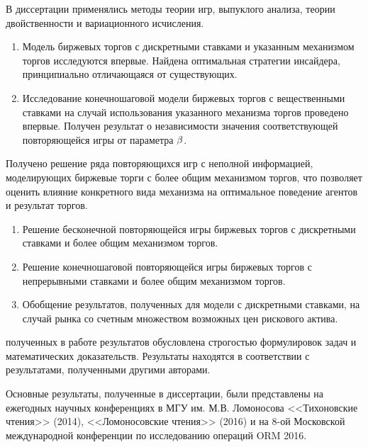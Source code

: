 {\methods} В диссертации применялись методы теории игр, выпуклого анализа, теории двойственности и вариационного исчисления.

{\novelty}
\begin{enumerate}
\item 
Модель биржевых торгов с дискретными ставками и указанным механизмом торгов исследуются впервые.
Найдена оптимальная стратегии инсайдера, принципиально отличающаяся от существующих.
\item 
Исследование конечношаговой модели биржевых торгов с вещественными ставками на случай использования указанного механизма торгов проведено впервые.
Получен результат о независимости значения соответствующей повторяющейся игры от параметра $\beta$.
\end{enumerate}

{\influence} Получено решение ряда повторяющихся игр с неполной информацией, моделирующих биржевые торги с более общим механизмом торгов, что позволяет оценить влияние конкретного вида механизма на оптимальное поведение агентов и результат торгов.

{}
\begin{enumerate}
\item
Решение бесконечной повторяющейся игры биржевых торгов с дискретными ставками и более общим механизмом торгов.
\item
Решение конечношаговой повторяющейся игры биржевых торгов с непрерывными ставками и более общим механизмом торгов.
\item
Обобщение результатов, полученных для модели с дискретными ставками, на случай рынка со счетным множеством возможных цен рискового актива.
\end{enumerate}

{\reliability} полученных в работе результатов обусловлена строгостью формулировок задач и математических доказательств.
Результаты находятся в соответствии с результатами, полученными другими авторами.

{\probation} Основные результаты, полученные в диссертации, были представлены на ежегодных научных конференциях в МГУ им. М.В. Ломоносова <<Тихоновские чтения>> (2014), <<Ломоносовские чтения>> (2016) и на 8-ой Московской международной конференции по исследованию операций ORM 2016.

